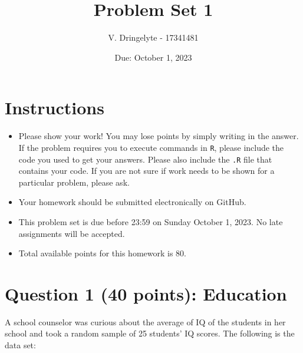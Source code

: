 \documentclass[12pt,letterpaper]{article}
\title{Problem Set 1}
\date{Due: October 1, 2023}
\author{V. Dringelyte - 17341481}
\begin{document}
	\maketitle
	
	\section*{Instructions}
	\begin{itemize}
	\item Please show your work! You may lose points by simply writing in the answer. If the problem requires you to execute commands in \texttt{R}, please include the code you used to get your answers. Please also include the \texttt{.R} file that contains your code. If you are not sure if work needs to be shown for a particular problem, please ask.
\item Your homework should be submitted electronically on GitHub.
\item This problem set is due before 23:59 on Sunday October 1, 2023. No late assignments will be accepted.
\item Total available points for this homework is 80.
	\end{itemize}
	
	\vspace{1cm}
	\section*{Question 1 (40 points): Education}

A school counselor was curious about the average of IQ of the students in her school and took a random sample of 25 students' IQ scores. The following is the data set:\\
\vspace{.5cm}

  

\vspace{1cm}
\end{document}

